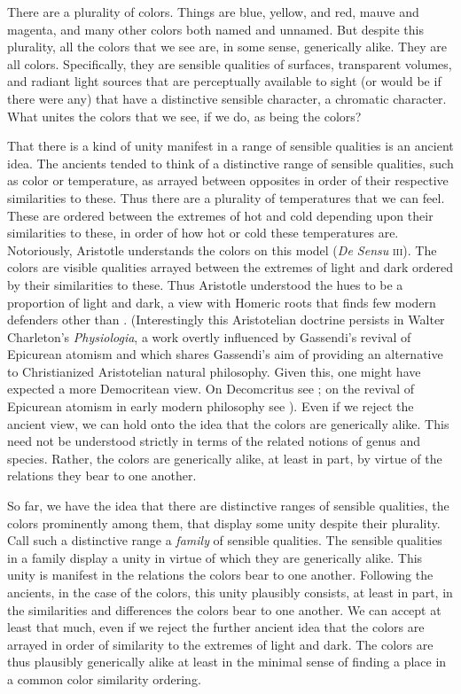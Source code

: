\documentclass[12pt]{article}
\begin{document}

There are a plurality of colors. Things are blue, yellow, and red, mauve and magenta, and many other colors both named and unnamed. But despite this plurality, all the colors that we see are, in some sense, generically alike. They are all colors. Specifically, they are sensible qualities of surfaces, transparent volumes, and radiant light sources that are perceptually available to sight (or would be if there were any) that have a distinctive sensible character, a chromatic character. What unites the colors that we see, if we do, as being the colors?

That there is a kind of unity manifest in a range of sensible qualities is an ancient idea. The ancients tended to think of a distinctive range of sensible qualities, such as color or temperature, as arrayed between opposites in order of their respective similarities to these. Thus there are a plurality of temperatures that we can feel. These are ordered between the extremes of hot and cold depending upon their similarities to these, in order of how hot or cold these temperatures are. Notoriously, Aristotle understands the colors on this model (\emph{De Sensu} \textsc{iii}). The colors are visible qualities arrayed between the extremes of light and dark ordered by their similarities to these. Thus Aristotle understood the hues to be a proportion of light and dark, a view with Homeric roots \citep{Gladstone:1858fk} that finds few modern defenders other than \citet{Goethe:1810uq}. (Interestingly this Aristotelian doctrine persists in Walter Charleton's \citeyear{Charleton:1654fk} \emph{Physiologia}, a work overtly influenced by Gassendi's revival of Epicurean atomism and which shares Gassendi's aim of providing an alternative to Christianized Aristotelian natural philosophy. Given this, one might have expected a more Democritean view. On Decomcritus see \citealt{Lee:2005qr,Pasnau:2007kx}; on the revival of Epicurean atomism in early modern philosophy see \citealt{Wilson:2008nr}). Even if we reject the ancient view, we can hold onto the idea that the colors are generically alike. This need not be understood strictly in terms of the related notions of genus and species. Rather, the colors are generically alike, at least in part, by virtue of the relations they bear to one another. 

So far, we have the idea that there are distinctive ranges of sensible qualities, the colors prominently among them, that display some unity despite their plurality. Call such a distinctive range a \emph{family} of sensible qualities. The sensible qualities in a family display a unity in virtue of which they are generically alike. This unity is manifest in the relations the colors bear to one another. Following the ancients, in the case of the colors, this unity plausibly consists, at least in part, in the similarities and differences the colors bear to one another. We can accept at least that much, even if we reject the further ancient idea that the colors are arrayed in order of similarity to the extremes of light and dark. The colors are thus plausibly generically alike at least in the minimal sense of finding a place in a common color similarity ordering. 
\end{document}
